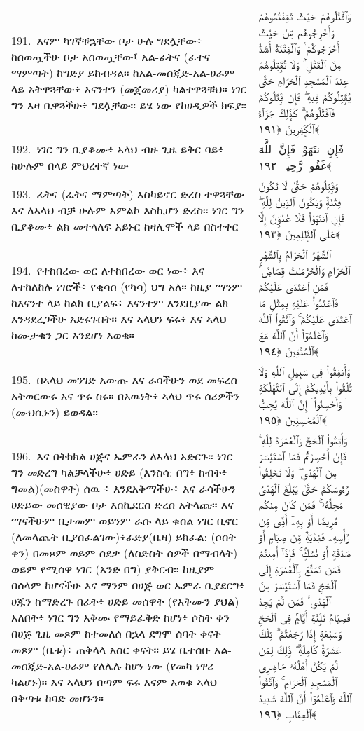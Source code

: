 \documentclass[11pt,a4paper,oneside]{article}%
\newcommand{\mytextarabic}[1]{\textarabic{ #1 \flushright}}
\begin{document}
\begin{longtable}{%
  @{}
    p{}
  @{~~~}
    p{}
    @{}
}
191.\ እናም ካገኛቹኋቸው ቦታ ሁሉ ግደሏቸው፥ ከስወጧችሁ ቦታ አስወጧቸው፤ አል-ፊትና (ፈተና ማምጣት) ከግድያ ይከብዳል። ከአል-መስጂድ-አል-ሀራም ላይ አትዋጓቸው፥ እናንተን (መጀመሪያ) ካልተዋጓቹህ። ነገር ግን እዛ ቢዋጓችሁ፥ ግደሏቸው። ይሄ ነው የከሀዲዎች ክፍያ። &  \mytextarabic{وَٱقْتُلُوهُمْ حَيْثُ ثَقِفْتُمُوهُمْ وَأَخْرِجُوهُم مِّنْ حَيْثُ أَخْرَجُوكُمْ ۚ وَٱلْفِتْنَةُ أَشَدُّ مِنَ ٱلْقَتْلِ ۚ وَلَا تُقَٟتِلُوهُمْ عِندَ ٱلْمَسْجِدِ ٱلْحَرَامِ حَتَّىٰ يُقَٟتِلُوكُمْ فِيهِ ۖ فَإِن قَٟتَلُوكُمْ فَٱقْتُلُوهُمْ ۗ كَذَٟلِكَ جَزَآءُ ٱلْكَٟفِرِينَ ﴿١٩١﴾}\\
192.\ ነገር ግን ቢያቆሙ፥ ኣላህ ብዙ-ጊዜ ይቅር ባይ፥ ከሁሉም በላይ ምህረተኛ ነው &  \mytextarabic{ فَإِنِ ٱنتَهَوْا۟ فَإِنَّ ٱللَّهَ غَفُورٌۭ رَّحِيمٌۭ ﴿١٩٢﴾}\\
193.\ ፊትና (ፈትና ማምጣት) እስካይኖር ድረስ ተዋጓቸው እና ለኣላህ ብቻ ሁሉም አምልኮ እስኪሆን ድረስ። ነገር ግን ቢያቆሙ፥ ልክ መተላለፍ አይኑር ከዛሊሞች ላይ በስተቀር &  \mytextarabic{وَقَٟتِلُوهُمْ حَتَّىٰ لَا تَكُونَ فِتْنَةٌۭ وَيَكُونَ ٱلدِّينُ لِلَّهِ ۖ فَإِنِ ٱنتَهَوْا۟ فَلَا عُدْوَٟنَ إِلَّا عَلَى ٱلظَّٟلِمِينَ ﴿١٩٣﴾}\\
194.\ የተከበረው ወር ለተከበረው ወር ነው፥ እና ለተከለከሉ ነገሮች፥ የቂሳስ (የካሳ) ህግ አለ። ከዚያ ማንም ከእናንተ ላይ ከልክ ቢያልፍ፥ እናንተም እንደዚያው ልክ እንዳደረጋችሁ አድሩጉበት። እና ኣላህን ፍሩ፥ እና ኣላህ ከሙታቁን ጋር እንደሆነ እወቁ። &  \mytextarabic{ٱلشَّهْرُ ٱلْحَرَامُ بِٱلشَّهْرِ ٱلْحَرَامِ وَٱلْحُرُمَـٰتُ قِصَاصٌۭ ۚ فَمَنِ ٱعْتَدَىٰ عَلَيْكُمْ فَٱعْتَدُوا۟ عَلَيْهِ بِمِثْلِ مَا ٱعْتَدَىٰ عَلَيْكُمْ ۚ وَٱتَّقُوا۟ ٱللَّهَ وَٱعْلَمُوٓا۟ أَنَّ ٱللَّهَ مَعَ ٱلْمُتَّقِينَ ﴿١٩٤﴾}\\
195.\ በኣላህ መንገድ አውጡ እና ራሳችሁን ወደ መፍረስ አትወርውሩ እና ጥሩ ስሩ። በእዉነት፥ ኣላህ ጥሩ ሰሪዎችን (ሙህሲኑን) ይወዳል። &  \mytextarabic{وَأَنفِقُوا۟ فِى سَبِيلِ ٱللَّهِ وَلَا تُلْقُوا۟ بِأَيْدِيكُمْ إِلَى ٱلتَّهْلُكَةِ ۛ وَأَحْسِنُوٓا۟ ۛ إِنَّ ٱللَّهَ يُحِبُّ ٱلْمُحْسِنِينَ ﴿١٩٥﴾}\\
196.\ እና በትክክል ሀጅና ኡምራን ለኣላህ አድርጉ። ነገር ግን መድረግ ካልቻላችሁ፥ ሀድይ (እንስሳ: በግ፥ ከብት፥ ግመል)(መስዋት) ሰዉ ፥ እንደአቅማችሁ፥ እና ራሳችሁን ሀድይው መሰዊያው ቦታ እስኪደርስ ድረስ አትላጩ። እና ማናችሁም ቢታመም ወይንም ራሱ ላይ ቁስል ነገር ቢኖር (ለመላጨት ቢያስፈልገው)፥ፊድያ(ቤዛ) ይክፈል: (ሶስት ቀን) በመጾም ወይም ሰደቃ (ለስድስት ሰዎች በማብላት) ወይም የሚሰዋ ነገር (አንድ በግ) ያቅርብ። ከዚያም በሰላም ከሆናችሁ እና ማንም በሀጅ ወር ኡምራ ቢያደርግ፥ ሀጁን ከማድረጉ በፊት፥ ሀድይ መሰዋት (የአቅሙን ያህል) አለበት፥ ነገር ግን አቅሙ የማይፈቅድ ከሆነ፥ ሶስት ቀን በሀጅ ጊዜ መጾም ከተመለሰ በኋላ ደግሞ ሰባት ቀናት መጾም (ቤቱ)፥ ጠቅላላ አስር ቀናት። ይሄ ቤተሰቡ አል-መስጂድ-አል-ሀራም የለሌሉ ከሆነ ነው (የመካ ነዋሪ ካልሆኑ)። እና ኣላህን በጣም ፍሩ እናም እወቁ ኣላህ በቅጣቱ ከባድ መሆኑን። &  \mytextarabic{وَأَتِمُّوا۟ ٱلْحَجَّ وَٱلْعُمْرَةَ لِلَّهِ ۚ فَإِنْ أُحْصِرْتُمْ فَمَا ٱسْتَيْسَرَ مِنَ ٱلْهَدْىِ ۖ وَلَا تَحْلِقُوا۟ رُءُوسَكُمْ حَتَّىٰ يَبْلُغَ ٱلْهَدْىُ مَحِلَّهُۥ ۚ فَمَن كَانَ مِنكُم مَّرِيضًا أَوْ بِهِۦٓ أَذًۭى مِّن رَّأْسِهِۦ فَفِدْيَةٌۭ مِّن صِيَامٍ أَوْ صَدَقَةٍ أَوْ نُسُكٍۢ ۚ فَإِذَآ أَمِنتُمْ فَمَن تَمَتَّعَ بِٱلْعُمْرَةِ إِلَى ٱلْحَجِّ فَمَا ٱسْتَيْسَرَ مِنَ ٱلْهَدْىِ ۚ فَمَن لَّمْ يَجِدْ فَصِيَامُ ثَلَٟثَةِ أَيَّامٍۢ فِى ٱلْحَجِّ وَسَبْعَةٍ إِذَا رَجَعْتُمْ ۗ تِلْكَ عَشَرَةٌۭ كَامِلَةٌۭ ۗ ذَٟلِكَ لِمَن لَّمْ يَكُنْ أَهْلُهُۥ حَاضِرِى ٱلْمَسْجِدِ ٱلْحَرَامِ ۚ وَٱتَّقُوا۟ ٱللَّهَ وَٱعْلَمُوٓا۟ أَنَّ ٱللَّهَ شَدِيدُ ٱلْعِقَابِ ﴿١٩٦﴾}\\

\end{longtable}
\end{document}
